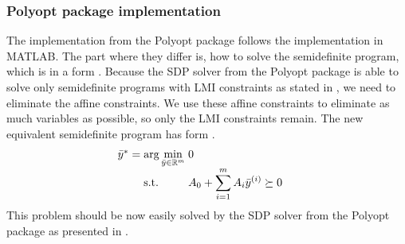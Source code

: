 \subsubsection{Polyopt package implementation}
The implementation from the Polyopt package follows the implementation in MATLAB.
The part where they differ is, how to solve the semidefinite program, which is in a form .
Because the SDP solver from the Polyopt package is able to solve only semidefinite programs with LMI constraints as stated in , we need to eliminate the affine constraints.
We use these affine constraints to eliminate as much variables as possible, so only the LMI constraints remain.
The new equivalent semidefinite program has form .
\begin{align}
  \arraycolsep=1.4pt
  \begin{array}{rclrcl@{\hskip0.5cm}l}
    \bar{y}^* &=& \displaystyle \arg\min_{\bar{y}\in\R^m} & \multicolumn{3}{l}{0} \\
    && \text{s.t.} & \displaystyle A_{0} + \sum_{i=1}^m A_{i}\bar{y}\ind i &\succeq& 0
  \end{array}\labeleq{POP:sol:SDP_LMI}
\end{align}
This problem should be now easily solved by the SDP solver from the Polyopt package as presented in .

